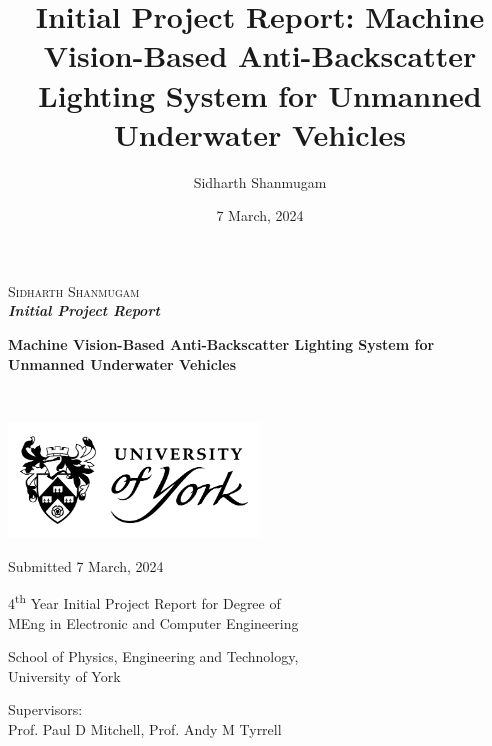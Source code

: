 \documentclass[12pt]{article}
\title{Initial Project Report: Machine Vision-Based Anti-Backscatter Lighting System for Unmanned Underwater Vehicles}
\author{Sidharth Shanmugam}
\date{7 March, 2024}
\begin{document}
\begin{onehalfspace}
    \begin{titlepage}

        \begin{FlushLeft}
            \textsc{\LARGE Sidharth Shanmugam}\\[0.8cm]
    
            \Large{
                \bfseries{
                    \emph{Initial Project Report}}}
            
            \hrulefill
    
            \LARGE{
                \bfseries{
                    Machine Vision-Based Anti-Backscatter Lighting System for Unmanned Underwater Vehicles}}
            
            \hrulefill\\[5.4cm]
    
        \end{FlushLeft}
        
        \vfill

        \begin{Center}
    
            \includegraphics[width=0.5\textwidth]{assets/uoy-logo-stacked-shield.png}

            \vfill
    
            \textsf{
                \large{
                    Submitted 7 March, 2024}}
    
            \vfill
    
            \textsf{
                \large{
                    4\textsuperscript{th} Year Initial Project Report for Degree of\\ MEng in Electronic and Computer Engineering}}
    
            \vfill
            
            \textsf{
                \large{
                    School of Physics, Engineering and Technology,\\ University of York}}
    
            \vfill
    
            \textsf{
                \large{
                    Supervisors:\\[0.2cm] Prof. Paul D Mitchell, Prof. Andy M Tyrrell}}
        
        \end{Center}
        
    \end{titlepage}
\end{onehalfspace}
\end{document}
